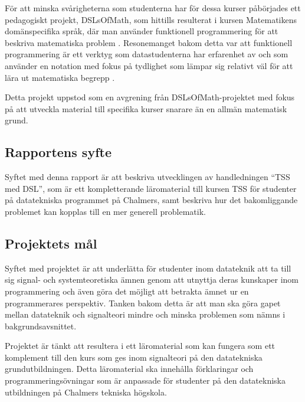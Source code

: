\documentclass[]{article}
\begin{document}
För att minska svårigheterna som studenterna har för dessa kurser påbörjades
ett pedagogiskt projekt, DSLsOfMath, som hittills resulterat i kursen
Matematikens domänspecifika språk, där man använder funktionell
programmering för att beskriva matematiska problem \cite{kursplan:dslsofmath}.
Resonemanget bakom detta var att funktionell programmering är ett verktyg
som datastudenterna har erfarenhet av och som använder en notation med
fokus på tydlighet som lämpar sig relativt väl för att lära ut matematiska
begrepp \cite{TFPIE15_DSLsofMath_IonescuJansson}.

Detta projekt uppstod som en avgrening från DSLsOfMath-projektet med fokus på
att utveckla material till specifika kurser snarare än en allmän matematisk
grund.

\subsection{Rapportens syfte}


Syftet med denna rapport är att beskriva utvecklingen av handledningen
``TSS med DSL'', som är ett kompletterande läromaterial till kursen TSS
för studenter på datatekniska programmet på Chalmers,
samt beskriva hur det bakomliggande problemet kan kopplas till en mer
generell problematik.

\subsection{Projektets mål}
Syftet med projektet är att underlätta för studenter inom datateknik att
ta till sig signal- och systemteoretiska ämnen genom att utnyttja deras
kunskaper inom programmering och även göra det möjligt att betrakta ämnet ur
en programmerares perspektiv. Tanken bakom detta är att man ska göra gapet
mellan datateknik och signalteori mindre och minska problemen som nämns
i bakgrundsavsnittet.

Projektet är tänkt att resultera i ett läromaterial som kan fungera som ett
komplement till den kurs som ges inom signalteori på den datatekniska
grundutbildningen. Detta läromaterial ska innehålla förklaringar och
programmeringsövningar som är anpassade för studenter på den datatekniska
utbildningen på Chalmers tekniska högskola.
\end{document}
